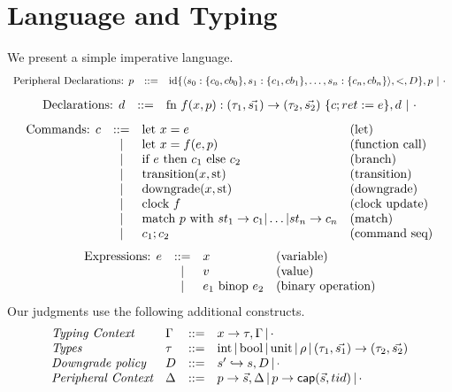 \section{Language and Typing}

We present a simple imperative language. 
\[
\begin{array}{lcll}
\text{Peripheral Declarations: }p & ::= & \text{id} \{\langle s_{0} : \{c_0, cb_0 \} ,s_{1} : \{c_1, cb_1 \},\ldots,s_{n} : \{c_n, cb_n \} \rangle, <, D \}, p \ \vert \ \cdot 
\end{array}
\]
\[
\begin{array}{lcll}
\text{Declarations: }d & ::= & \text{fn } f(x, p) : (\tau_1, \Vec{s_1}) \rightarrow (\tau_2, \Vec{s_2}) \  \{c; ret := e\}, d \ \vert \ \cdot
\end{array}
\]
\[
\begin{array}{lcll}
\text{Commands: }c & ::= & \text{let } x = e & \text{(let)} \\ & \,|\, &\text{let } x = f(e, p) & \text{(function call)} \\ & \,|\, & \text{if } e \text{ then } c_1 \text{ else } c_2 & \text{(branch)} \\ & \,|\, & \text{transition}(x, \text{st}) & \text{(transition)} \\ & \,|\, & \text{downgrade}(x, \text{st}) & \text{(downgrade)} \\ & \,|\, & \text{clock } f & \text{(clock update)} \\ & \,|\, & \text{match }p \text{ with } st_1 \rightarrow c_1 | \dots | st_n \rightarrow c_n & \text{(match)} \\ & \,|\, & c_1; c_2 & \text{(command seq)}
\end{array}
\]
\[
\begin{array}{lcll}
\text{Expressions: }e & ::= & x & \text{(variable)}  \\ & \,|\, & v & \text{(value)} \\ & \,|\, & e_1 \text{ binop } e_2 & \text{(binary operation)} 
\end{array}
\]
Our judgments use the following additional constructs. 
\[
\begin{array}{llcl}
\textit{Typing Context} & \Gamma & ::= & x \rightarrow \tau, \Gamma \,|\, \cdot
\\ 
\textit{Types} & \tau & ::= & \text{int} \,|\, \text{bool} \,|\, \text{unit} \,|\, \rho \,|\, (\tau_1, \Vec{s_1}) \rightarrow (\tau_2, \Vec{s_2})  
\\
\textit{Downgrade policy} & D & ::= & s' \hookrightarrow s, D \,|\, \cdot
\\
\textit{Peripheral Context} & \Delta & ::= &  p \rightarrow \Vec{s}, \Delta \,|\, p \rightarrow \mathsf{cap}(\Vec{s}, tid) \,|\, \cdot
\end{array}
\]

